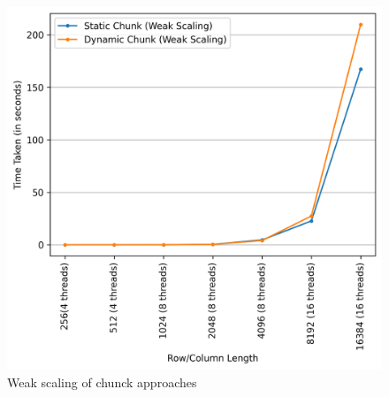 \begin{figure}[h!]
\begin{minipage}[t]{0.49\textwidth}
    \end{minipage}
    \begin{minipage}[t]{0.65\textwidth}
        \centering
        \includegraphics[width=\textwidth]{img/FastFlow/ff_static_vs_dynamic.png}
        \caption{Weak scaling of chunck approaches}
        \label{FF_Chunk}
    \end{minipage}
\end{figure}